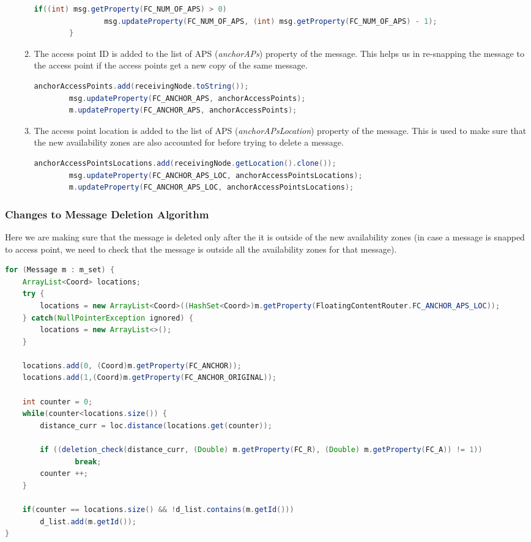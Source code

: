 \begin{enumerate}
\begin{enumerate}
\begin{lstlisting}[language=java]
			if((int) msg.getProperty(FC_NUM_OF_APS) > 0)
				msg.updateProperty(FC_NUM_OF_APS, (int) msg.getProperty(FC_NUM_OF_APS) - 1);
		}
		\end{lstlisting}
		\item The access point ID is added to the list of APS (\textit{anchorAPs}) property of the message. This helps us in re-snapping the message to the access point if the access points get a new copy of the same message.
		\begin{lstlisting}[language=java]
		anchorAccessPoints.add(receivingNode.toString());				
		msg.updateProperty(FC_ANCHOR_APS, anchorAccessPoints);
		m.updateProperty(FC_ANCHOR_APS, anchorAccessPoints);
		\end{lstlisting}
		\item The access point location is added to the list of APS (\textit{anchorAPsLocation}) property of the message. This is used to make sure that the new availability zones are also accounted for before trying to delete a message.
		\begin{lstlisting}[language=java]
		anchorAccessPointsLocations.add(receivingNode.getLocation().clone());
		msg.updateProperty(FC_ANCHOR_APS_LOC, anchorAccessPointsLocations);
		m.updateProperty(FC_ANCHOR_APS_LOC, anchorAccessPointsLocations);
		\end{lstlisting}
		\end{enumerate}
\end{enumerate}
\subsubsection{Changes to Message Deletion Algorithm}
Here we are making sure that the message is deleted only after the it is outside of the new availability zones (in case a message is snapped to access point, we need to check that the message is outside all the availability zones for that message).

\begin{lstlisting}[language=java]
for (Message m : m_set) {
	ArrayList<Coord> locations;
	try {
		locations = new ArrayList<Coord>((HashSet<Coord>)m.getProperty(FloatingContentRouter.FC_ANCHOR_APS_LOC));
	} catch(NullPointerException ignored) {
		locations = new ArrayList<>();						
	}

	locations.add(0, (Coord)m.getProperty(FC_ANCHOR));
	locations.add(1,(Coord)m.getProperty(FC_ANCHOR_ORIGINAL));
		
	int counter = 0;
	while(counter<locations.size()) {
		distance_curr = loc.distance(locations.get(counter));
		
		if ((deletion_check(distance_curr, (Double) m.getProperty(FC_R), (Double) m.getProperty(FC_A)) != 1))
				break;
		counter ++;
	}
					
	if(counter == locations.size() && !d_list.contains(m.getId()))
		d_list.add(m.getId());
}
\end{lstlisting}
